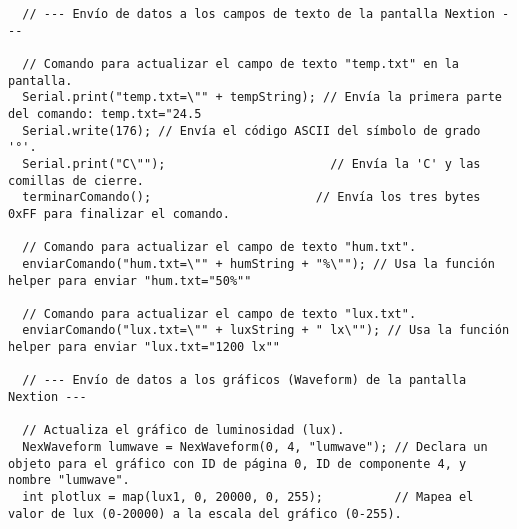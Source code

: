 \begin{listing}[H]
\begin{verbatim}
  // --- Envío de datos a los campos de texto de la pantalla Nextion ---

  // Comando para actualizar el campo de texto "temp.txt" en la pantalla.
  Serial.print("temp.txt=\"" + tempString); // Envía la primera parte del comando: temp.txt="24.5
  Serial.write(176); // Envía el código ASCII del símbolo de grado '°'.
  Serial.print("C\"");                       // Envía la 'C' y las comillas de cierre.
  terminarComando();                       // Envía los tres bytes 0xFF para finalizar el comando.

  // Comando para actualizar el campo de texto "hum.txt".
  enviarComando("hum.txt=\"" + humString + "%\""); // Usa la función helper para enviar "hum.txt="50%""

  // Comando para actualizar el campo de texto "lux.txt".
  enviarComando("lux.txt=\"" + luxString + " lx\""); // Usa la función helper para enviar "lux.txt="1200 lx""

  // --- Envío de datos a los gráficos (Waveform) de la pantalla Nextion ---

  // Actualiza el gráfico de luminosidad (lux).
  NexWaveform lumwave = NexWaveform(0, 4, "lumwave"); // Declara un objeto para el gráfico con ID de página 0, ID de componente 4, y nombre "lumwave".
  int plotlux = map(lux1, 0, 20000, 0, 255);          // Mapea el valor de lux (0-20000) a la escala del gráfico (0-255).
\end{verbatim}
   \end{listing}

